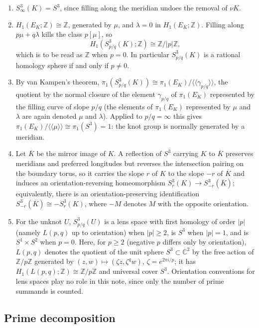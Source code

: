 \documentclass[11pt]{article}
\newcommand{\Z}{\mathbb Z}
\newcommand{\Surg}[2]{S^3_{#1}(#2)}
\newcommand{\nbd}{\nu}
\theoremstyle{definition}
\theoremstyle{remark}
\begin{document}
\begin{enumerate}
\item[(S1)] \(\Surg{\infty}{K}=S^3\), since filling along the meridian
undoes the removal of \(\nbd K\).
\item[(S2)] \(H_1(E_K;\Z)\cong\Z\), generated by \(\mu\), and \(\lambda=0\)
in \(H_1(E_K;\Z)\). Filling along \(p\mu+q\lambda\) kills the class
\(p[\mu]\), so
\[
 H_1(\Surg{p/q}{K};\Z)\cong\Z/|p|\Z,
\]
which is to be read as \(\Z\) when \(p=0\). In particular
\(\Surg{p/q}{K}\) is a rational homology sphere if and only if \(p\neq0\).
\item[(S3)] By van Kampen's theorem,
\(\pi_1(\Surg{p/q}{K})\cong\pi_1(E_K)/\langle\!\langle\gamma_{p/q}\rangle\!\rangle\),
the quotient by the normal closure of the element \(\gamma_{p/q}\) of
\(\pi_1(E_K)\) represented by the filling curve of slope \(p/q\) (the
elements of \(\pi_1(E_K)\) represented by \(\mu\) and \(\lambda\) are
again denoted \(\mu\) and \(\lambda\)). Applied to \(p/q=\infty\) this
gives
\(\pi_1(E_K)/\langle\!\langle\mu\rangle\!\rangle\cong\pi_1(S^3)=1\): the
knot group is normally generated by a meridian.
\item[(S4)] Let \(\overline K\) be the mirror image of \(K\). A reflection
of \(S^3\) carrying \(K\) to \(\overline K\) preserves meridians and
preferred longitudes but reverses the intersection pairing on the
boundary torus, so it carries the slope \(r\) of \(K\) to the slope
\(-r\) of \(\overline K\) and induces an orientation-reversing
homeomorphism \(\Surg{r}{K}\to\Surg{-r}{\overline K}\); equivalently,
there is an orientation-preserving identification
\(\Surg{-r}{\overline K}\cong-\Surg{r}{K}\), where \(-M\) denotes \(M\)
with the opposite orientation.
\item[(S5)] For the unknot \(U\), \(\Surg{p/q}{U}\) is a lens space
with first homology of order \(|p|\) (namely \(L(p,q)\) up to
orientation) when \(|p|\geq2\), is \(S^3\) when \(|p|=1\), and is
\(S^1\times S^2\) when \(p=0\). Here, for \(p\geq2\) (negative \(p\)
differs only by orientation), \(L(p,q)\) denotes the quotient of the
unit sphere \(S^3\subset\mathbb C^2\) by the free action of \(\Z/p\Z\)
generated by \((z,w)\mapsto(\zeta z,\zeta^{q}w)\), \(\zeta=e^{2\pi i/p}\);
it has \(H_1(L(p,q);\Z)\cong\Z/p\Z\) and universal cover \(S^3\).
Orientation conventions for lens spaces play no role in this note, since
only the number of prime summands is counted.
\end{enumerate}

\subsection{Prime decomposition}\label{sec:prime}
\end{document}
